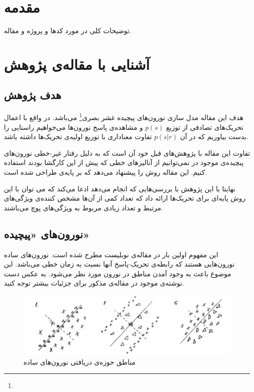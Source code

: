 \documentclass[12pt,onecolumn,a4paper,fleqn]{article}
\begin{document}
	\neurotitlepage

\section*{مقدمه}

توضیحات کلی در مورد کدها و پروژه و مقاله.

\pagebreak

\section{آشنایی با مقاله‌ی پژوهش}

\subsection{هدف پژوهش}
هدف این مقاله مدل سازی  نورون‌های پیچیده‌ غشر بصری\footnote{} می‌باشد. در واقع با اعمال تحریک‌های تصادفی  از توزیع 
$p(s)$
و مشاهده‌ی پاسخ نورون‌ها می‌خواهیم راستایی را بدست بیاوریم که در آن $p(s|r)$ تفاوت معناداری با توزیع اولیه‌ی تحریک‌ها داشته باشد.

تفاوت این مقاله با پژوهش‌های قبل خود آن است که به دلیل رفتار غیر-خطی نورون‌های پیچیده‌ی موجود در   نمی‌توانیم از آنالیز‌های خطی 
که پیش از این کارگشا بودند استفاده کنیم. این مقاله روش 
 را پیشنهاد می‌دهد که بر پایه‌ی  طراحی شده است.

نهایتا با این پژوهش با بررسی‌هایی که انجام می‌دهد ادعا می‌کند که می توان  با این روش پایه‌ای برای تحریک‌ها ارائه داد که تعداد کمی از آن‌ها مشخص کننده‌ی ویژگی‌های مرتبط و تعداد زیادی مربوط به ویژگی‌های پوچ می‌باشند.
\subsection{نورون‌های‌ «پیچیده»}
این مفهوم اولین بار در مقاله‌ی نوبلیست  مطرح شده است. نورون‌های ساده نورون‌هایی هستند که رابطه‌ی تحریک-پاسخ آنها نسبت به زمان خطی می‌باشد. این موضوع باعث به وجود آمدن مناطق  در  نورون مورد نظر می‌شود. به عکس دست نوشته‌ی موجود در مقاله‌ی مذکور برای جزئیات بیشتر توجه کنید.

\begin{figure}[h]
	\centering
	\includegraphics[width=0.8\linewidth]{photos/simple_cells.png}
  \caption[]{مناطق  حوزه‌ی دریافتی نورون‌های ساده\footnotemark}
\end{figure}
\end{document}
